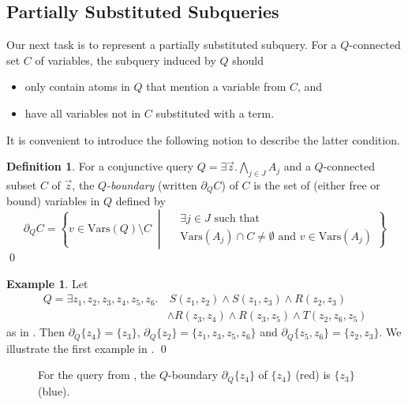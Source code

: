 \documentclass[12pt]{report}
\theoremstyle{plain}
\theoremstyle{definition}
\newtheorem{definition}[theorem]{Definition}
\newtheorem{example}[theorem]{Example}
\def\Vars{{\mathrm{Vars}}}
\begin{document}
\subsection{Partially Substituted Subqueries}
\label{subsection:partially-substituted-subqueries}

Our next task is to represent a partially substituted subquery. For a $Q$-connected set $C$ of variables, the subquery induced by $Q$ should
\begin{itemize}
  \item only contain atoms in $Q$ that mention a variable from $C$, and
  \item have all variables not in $C$ substituted with a term.
\end{itemize}
It is convenient to introduce the following notion to describe the latter condition.

\begin{definition}
  For a conjunctive query $Q = \exists \vec{z}. \bigwedge_{j \in J} A_j$ and a $Q$-connected subset $C$ of $\vec{z}$, the \emph{$Q$-boundary} (written $\partial_Q C$) of $C$ is the set of (either free or bound) variables in $Q$ defined by $$
    \partial_Q C = \left\{
      v \in \Vars(Q) \setminus C
        \;\middle|\;
      \begin{aligned}
        & \exists j \in J \text{ such that } \\
        & \Vars(A_j) \cap C \neq \emptyset \text{ and } v \in \Vars(A_j)
      \end{aligned}
    \right\}
  $$
  \qed
\end{definition}

\begin{example}
  Let
  \begin{align*}
    Q = \exists z_1,z_2,z_3,z_4,z_5,z_6.&\ S(z_1, z_2) \wedge S(z_1,z_3) \wedge R(z_2, z_3) \\
    &\wedge R(z_3, z_4) \wedge R(z_3, z_5) \wedge T(z_2, z_6, z_5)
  \end{align*}
  as in . Then $\partial_Q \{z_4\} = \{z_3\}$, $\partial_Q \{z_2\} = \{z_1, z_3, z_5, z_6\}$ and $\partial_Q \{z_5, z_6\} = \{z_2, z_3\}$. We illustrate the first example in .
  \qed
\end{example}

\begin{figure}[h]
  \centering
  
  \caption{For the query from , the $Q$-boundary $\partial_Q \{z_4\}$ of $\{z_4\}$ (red) is $\{z_3\}$ (blue).}
  \label{figure:query-boundary}
\end{figure}
\end{document}
